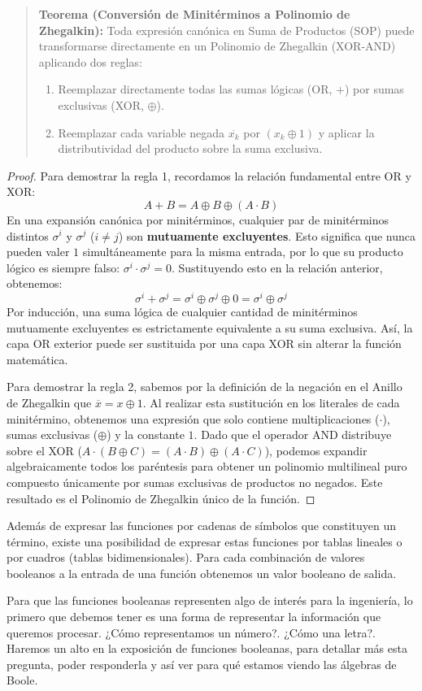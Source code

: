 \begin{quote}\textbf{Teorema (Conversión de Minitérminos a Polinomio de Zhegalkin):}\label{minterms_to_zhegalkin}
Toda expresión canónica en Suma de Productos (SOP) puede transformarse directamente en un Polinomio de Zhegalkin (XOR-AND) aplicando dos reglas:
\begin{enumerate}
    \item Reemplazar directamente todas las sumas lógicas (OR, $+$) por sumas exclusivas (XOR, $\oplus$).
    \item Reemplazar cada variable negada $\overline{x_k}$ por $(x_k \oplus 1)$ y aplicar la distributividad del producto sobre la suma exclusiva.
\end{enumerate}
\end{quote}
\begin{proof}
Para demostrar la regla 1, recordamos la relación fundamental entre OR y XOR:
\[ A + B = A \oplus B \oplus (A \cdot B) \]
En una expansión canónica por minitérminos, cualquier par de minitérminos distintos $\sigma^i$ y $\sigma^j$ ($i \ne j$) son \textbf{mutuamente excluyentes}. Esto significa que nunca pueden valer $1$ simultáneamente para la misma entrada, por lo que su producto lógico es siempre falso: $\sigma^i \cdot \sigma^j = 0.$
Sustituyendo esto en la relación anterior, obtenemos:
\[ \sigma^i + \sigma^j = \sigma^i \oplus \sigma^j \oplus 0 = \sigma^i \oplus \sigma^j \]
Por inducción, una suma lógica de cualquier cantidad de minitérminos mutuamente excluyentes es estrictamente equivalente a su suma exclusiva. Así, la capa OR exterior puede ser sustituida por una capa XOR sin alterar la función matemática.

Para demostrar la regla 2, sabemos por la definición de la negación en el Anillo de Zhegalkin que $\overline{x} = x \oplus 1.$ Al realizar esta sustitución en los literales de cada minitérmino, obtenemos una expresión que solo contiene multiplicaciones ($\cdot$), sumas exclusivas ($\oplus$) y la constante $1.$ Dado que el operador AND distribuye sobre el XOR ($A \cdot (B \oplus C) = (A \cdot B) \oplus (A \cdot C)$), podemos expandir algebraicamente todos los paréntesis para obtener un polinomio multilineal puro compuesto únicamente por sumas exclusivas de productos no negados. Este resultado es el Polinomio de Zhegalkin único de la función.
\end{proof}

Además de expresar las funciones por cadenas de símbolos que constituyen un término, existe una posibilidad de expresar estas funciones por tablas lineales o por cuadros (tablas bidimensionales). Para cada combinación de valores booleanos a la entrada de una función obtenemos un valor booleano de salida.

Para que las funciones booleanas representen algo de interés para la ingeniería, lo primero que debemos tener es una forma de representar la información que queremos procesar. ¿Cómo representamos un número?. ¿Cómo una letra?. Haremos un alto en la exposición de funciones booleanas, para detallar más esta pregunta, poder responderla y así ver para qué estamos viendo las álgebras de Boole.
